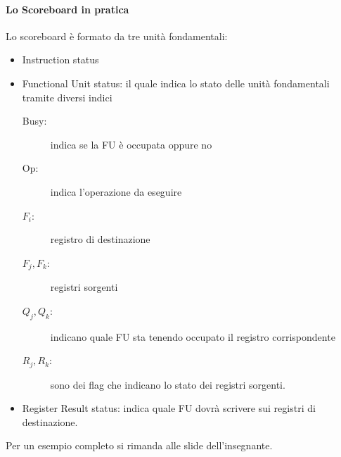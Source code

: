 \paragraph{Lo Scoreboard in pratica}
Lo scoreboard è formato da tre unità fondamentali:
\begin{itemize}
\item Instruction status
\item Functional Unit status: il quale indica lo stato delle unità fondamentali tramite diversi indici
\begin{description}
\item[Busy:] indica se la FU è occupata oppure no
\item[Op:] indica l'operazione da eseguire
\item[$F_i$:] registro di destinazione
\item[$F_j,F_k$:] registri sorgenti
\item[$Q_j,Q_k$:] indicano quale FU sta tenendo occupato il registro corrispondente
\item[$R_j,R_k$:] sono dei flag che indicano lo stato dei registri sorgenti.
\end{description}
\item Register Result status: indica quale FU dovrà scrivere sui registri di destinazione.
\end{itemize}
Per un esempio completo si rimanda alle slide dell'insegnante.
